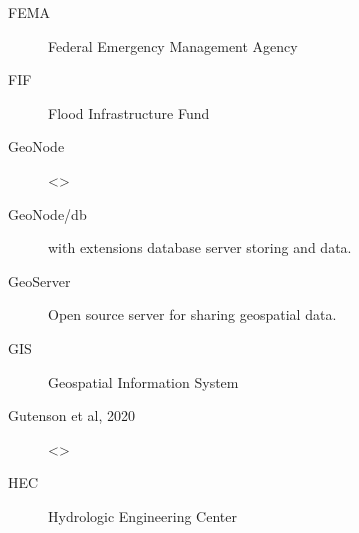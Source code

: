 \documentclass[letterpaper,12pt,english]{book}
\begin{document}
\begin{description}
\item[{FEMA\label{\detokenize{glossary:term-FEMA}}}] \leavevmode
\sphinxAtStartPar
Federal Emergency Management Agency

\item[{FIF\label{\detokenize{glossary:term-FIF}}}] \leavevmode
\sphinxAtStartPar
Flood Infrastructure Fund

\item[{GeoNode\label{\detokenize{glossary:term-GeoNode}}}] \leavevmode
\sphinxAtStartPar
\textless{}\textgreater{}

\item[{GeoNode/db\label{\detokenize{glossary:term-GeoNode-db}}}] \leavevmode
\sphinxAtStartPar
{\hyperref[\detokenize{glossary:term-PostgreSQL}]{}} with {\hyperref[\detokenize{glossary:term-PostGIS}]{}} extensions database server storing {\hyperref[\detokenize{glossary:term-GeoNode}]{}} {\hyperref[\detokenize{glossary:term-Django}]{}} and {\hyperref[\detokenize{glossary:term-GeoServer}]{}} data.

\item[{GeoServer\label{\detokenize{glossary:term-GeoServer}}}] \leavevmode
\sphinxAtStartPar
Open source server for sharing geospatial data.

\item[{GIS\label{\detokenize{glossary:term-GIS}}}] \leavevmode
\sphinxAtStartPar
Geospatial Information System

\item[{Gutenson et al, 2020\label{\detokenize{glossary:term-Gutenson-et-al-2020}}}] \leavevmode
\sphinxAtStartPar
\textless{}\textgreater{}

\item[{HEC\label{\detokenize{glossary:term-HEC}}}] \leavevmode
\sphinxAtStartPar
Hydrologic Engineering Center


\end{description}
\end{document}
